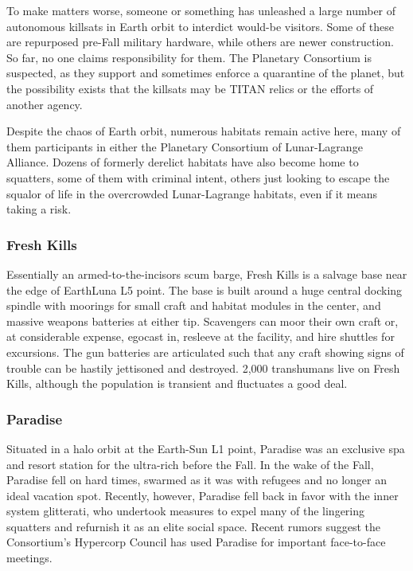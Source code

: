 To make matters worse, someone or something has 
unleashed a large number of autonomous killsats in 
Earth orbit to interdict would-be visitors. Some of 
these are repurposed pre-Fall military hardware, while 
others are newer construction. So far, no one claims 
responsibility for them. The Planetary Consortium 
is suspected, as they support and sometimes enforce 
a quarantine of the planet, but the possibility exists 
that the killsats may be TITAN relics or the efforts of 
another agency.

Despite the chaos of Earth orbit, numerous habitats 
remain active here, many of them participants in either 
the Planetary Consortium of Lunar-Lagrange Alliance. 
Dozens of formerly derelict habitats have also become 
home to squatters, some of them with criminal intent, 
others just looking to escape the squalor of life in 
the overcrowded Lunar-Lagrange habitats, even if it 
means taking a risk.

\subsubsection{Fresh Kills}

Essentially an armed-to-the-incisors scum barge, 
Fresh Kills is a salvage base near the edge of EarthLuna L5 point. The base is built around a huge 
central docking spindle with moorings for small 
craft and habitat modules in the center, and massive weapons batteries at either tip. Scavengers can 
moor their own craft or, at considerable expense, 
egocast in, resleeve at the facility, and hire shuttles 
for excursions. The gun batteries are articulated such 
that any craft showing signs of trouble can be hastily 
jettisoned and destroyed. 2,000 transhumans live on 
Fresh Kills, although the population is transient and 
fluctuates a good deal.

\subsubsection{Paradise}

Situated in a halo orbit at the Earth-Sun L1 point, 
Paradise was an exclusive spa and resort station 
for the ultra-rich before the Fall. In the wake of the 
Fall, Paradise fell on hard times, swarmed as it was 
with refugees and no longer an ideal vacation spot. 
Recently, however, Paradise fell back in favor with the 
inner system glitterati, who undertook measures to 
expel many of the lingering squatters and refurnish 
it as an elite social space. Recent rumors suggest the 
Consortium's Hypercorp Council has used Paradise 
for important face-to-face meetings.

